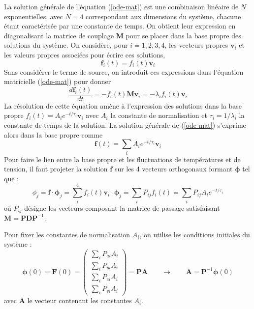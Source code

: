 La solution générale de l'équation (\ref{ode-mat}) est une combinaison linéaire de $N$ exponentielles, avec $N=4$ correspondant aux dimensions du système, chacune étant caractérisée par une constante de temps. On obtient leur expression en diagonalisant la matrice de couplage $\bm{M}$ pour se placer dans la base propre des solutions du système. On considère, pour $i=1,2,3,4$, les vecteurs propres $\bm{v}_i$ et les valeurs propres associées pour écrire ces solutions,
\begin{equation}
\label{eigen-soluc}
\bm{f}_i(t) = f_i(t) \bm{v}_i
\end{equation}
Sans considérer le terme de source, on introduit ces expressions dans l'équation matricielle (\ref{ode-mat}) pour donner
\begin{equation}
\label{eigen-soluc-ode}
\frac{d \bm{f}_i(t)}{d t} = -f_i(t) \bm{M} \bm{v}_i = -\lambda_i f_i(t) \bm{v}_i
\end{equation}
La résolution de cette équation amène à l'expression des solutions dans la base propre $f_i(t) = A_i e^{-t/\tau_i} \bm{v}_i$ avec $A_i$ la constante de normalisation et $\tau_i=1/\lambda_i$ la constante de temps de la solution. La solution générale de (\ref{ode-mat}) s'exprime alors dans la base propre comme
\begin{equation}
\label{eigein-solc-expr}
\bm{f}(t) = \sum_i A_i e^{-t/\tau_i} \bm{v}_i
\end{equation}
Pour faire le lien entre la base propre et les fluctuations de températures et de tension, il faut projeter la solution $\bm{f}$ sur les 4 vecteurs orthogonaux formant $\bm{\phi}$ tel que :
\begin{equation}
\label{gen-soluc}
\phi_j = \bm{f} \cdot \bm{\phi}_j = \sum_i^4 f_i(t) \bm{v}_i \cdot \bm{\phi}_j = \sum_i P_{ij} f_i(t) = \sum_i P_{ij} A_i e^{-t/\tau_i}
\end{equation}
où $P_{ij}$ désigne les vecteurs composant la matrice de passage satisfaisant $\bm{M}=\bm{P} \bm{D} \bm{P}^{-1}$.

Pour fixer les constantes de normalisation $A_i$, on utilise les conditions initiales du système :
\begin{equation}
\bm{\phi}(0) = \bm{F}(0) =
\left( \begin{array}{c}
\sum_i P_{ai} A_i\\
\sum_i P_{pi} A_i\\
\sum_i P_{ei} A_i\\
\sum_i P_{vi} A_i
\end{array} \right) = \bm{P} \bm{A}
\qquad \longrightarrow \qquad \bm{A}=\bm{P}^{-1} \bm{\phi} (0)
\label{normal}
\end{equation}
avec $\bm{A}$ le vecteur contenant les constantes $A_i$.

